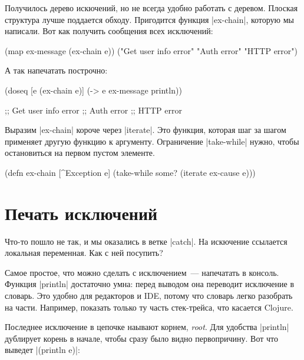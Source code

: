 Получилось дерево искючений, но не всегда удобно работать с деревом. Плоская
структура лучше поддается обходу. Пригодится функция \spverb|ex-chain|, которую
мы написали. Вот как получить сообщения всех исключений:

\begin{english}
  \begin{clojure}
(map ex-message (ex-chain e))
("Get user info error" "Auth error" "HTTP error")
  \end{clojure}
\end{english}

\noindent
А так напечатать построчно:

\begin{english}
  \begin{clojure}
(doseq [e (ex-chain e)]
  (-> e ex-message println))

;; Get user info error
;; Auth error
;; HTTP error
  \end{clojure}
\end{english}

Выразим \spverb|ex-chain| короче через \spverb|iterate|. Это функция, которая
шаг за шагом применяет другую функцию к аргументу. Ограничение
\spverb|take-while| нужно, чтобы остановиться на первом пустом элементе.

\begin{english}
  \begin{clojure}
(defn ex-chain [^Exception e]
  (take-while some? (iterate ex-cause e)))
  \end{clojure}
\end{english}

\section{Печать исключений}

Что-то пошло не так, и мы оказались в ветке \spverb|catch|. На искючение
ссылается локальная переменная. Как с ней посупить?

Самое простое, что можно сделать с исключением~--- напечатать в консоль. Функция
\spverb|println| достаточно умна: перед выводом она переводит исключение в
словарь. Это удобно для редакторов и IDE, потому что словарь легко разобрать на
части. Например, показать только ту часть стек-трейса, что касается Clojure.

Последнее исключение в цепочке наывают корнем, \emph{root}. Для удобства
\spverb|println| дублирует корень в начале, чтобы сразу было видно
первопричину. Вот что выведет \spverb|(println e)|:

